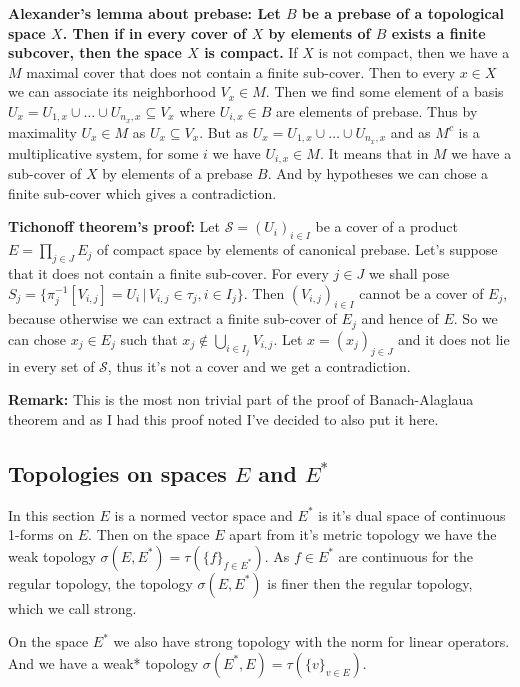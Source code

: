 \documentclass{article}
\begin{document}
\textbf{Alexander's lemma about prebase: Let $B$ be a prebase of a topological
space $X$. Then if in every cover of $X$ by elements of $B$ exists a finite
subcover, then the space $X$ is compact.} If $X$ is not compact, then we have
a $M$ maximal cover that does not contain a finite sub-cover. Then to every
$x\in X$ we can associate its neighborhood $V_x\in M$. Then we find some
element of a basis $U_x=U_{1,x}\cup\ldots\cup U_{n_x,x}\subseteq V_x$ where
$U_{i,x}\in B$ are elements of prebase. Thus by maximality $U_x\in M$ as
$U_x\subseteq V_x$. But as $U_x=U_{1,x}\cup\ldots\cup U_{n_x,x}$ and as $M^c$
is a multiplicative system, for some $i$ we have $U_{i,x}\in M$. It means that
in $M$ we have a sub-cover of $X$ by elements of a prebase $B$. And by hypotheses
we can chose a finite sub-cover which gives a contradiction.
\vspace{1ex}

\textbf{Tichonoff theorem's proof:} Let $\mathcal{S}=(U_i)_{i\in I}$ be a cover of a
product $E=\prod_{j\in J} E_j$ of compact space by elements of canonical prebase.
Let's suppose that it does not contain a finite sub-cover. For every $j\in J$
we shall pose $S_j=\{\pi_j^{-1}[V_{i,j}]=U_i\,|\,V_{i,j}\in\tau_j,i\in I_j\}$.
Then $(V_{i,j})_{i\in I}$ cannot be a cover of $E_j$, because otherwise we can
extract a finite sub-cover of $E_j$ and hence of $E$. So we can chose $x_j\in
E_j$ such that $x_j\notin\bigcup_{i\in I_j}V_{i,j}$. Let $x=(x_j)_{j\in J}$ and
it does not lie in every set of $\mathcal{S}$, thus it's not a cover and we get
a contradiction.

\vspace{1ex}
\textbf{Remark:} This is the most non trivial part of the proof of Banach-Alaglaua
theorem and as I had this proof noted I've decided to also put it here.

\subsection{Topologies on spaces $E$ and $E^*$}
In this section $E$ is a normed vector space and $E^*$ is it's dual space of continuous
1-forms on $E$. Then on the space $E$ apart from it's metric topology we have
the weak topology $\sigma(E, E^*)=\tau(\{f\}_{f\in E^*})$. As $f\in E^*$ are
continuous for the regular topology, the topology $\sigma(E, E^*)$ is finer
then the regular topology, which we call strong.
\vspace{1ex}

On the space $E^*$ we also have strong topology with the norm for linear
operators. And we have a weak* topology $\sigma(E^*, E)=\tau(\{v\}_{v\in E})$.
\end{document}
